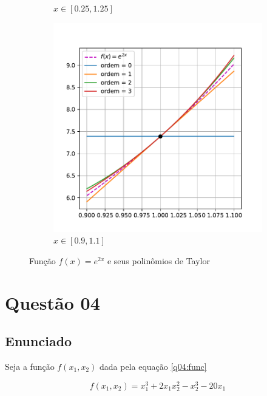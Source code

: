 \documentclass[10pt, a4paper]{article}
\begin{document}
\begin{figure}
\begin{subfigure}[b]{0.32\textwidth}
        \caption{$x \in [0.25, 1.25]$}
        \label{fig:q3_2}
    \end{subfigure}
    \hfill
    \begin{subfigure}[b]{0.32\textwidth}
        \centering
        \includegraphics[width=\textwidth]{images/q3_3.pdf}
        \caption{$x \in [0.9, 1.1]$}
        \label{fig:q3_3}
    \end{subfigure}
       \caption{Função $f(x) = e^{2x}$ e seus polinômios de Taylor}
       \label{fig:q3}
\end{figure}

\section[q04]{Questão 04}

\subsection[q04:enunciado]{Enunciado}

Seja a função $f(x_1, x_2)$ dada pela equação \cref{q04:func}

\begin{equation}\label{q04:func}
    f(x_1, x_2) = x_1^3 + 2x_1 x_2^2 - x_2^3 - 20x_1
\end{equation}
\end{document}
